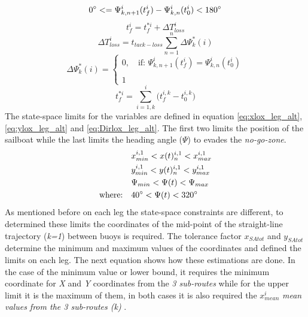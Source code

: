 \begin{equation}\label{eq:shift_Dir}
    0 \degree <=\Psi_{k,n+1}^{i}(t_{f}^{i}) - \Psi_{k,n}^{i}(t_{0}^{i}) <180 \degree
\end{equation}
\begin{equation} \label{eq:FinalTime}
    t_{f}^{i}=t_{f}^{*i} + \Delta T_{loss}^i
\end{equation}
\begin{equation} \label{eq:Tot_TimeLoss}
    \Delta T_{loss}^i=t_{tack-loss} \sum_{n=1}^{n} \Delta \Psi_{k}^* (i)
\end{equation}
\begin{equation} \label{eq:shiftDirCount}
\Delta\Psi_{k}^*(i)=
\begin{cases}
0, \quad  \text{if: } \Psi_{k,n+1}^{i}(t_{f}^{i}) = \Psi_{k,n}^{i}(t_{0}^{i})\\
\\
1 %
\end{cases}
\end{equation}
\begin{equation} \label{eq:TimeFinal_acum}
    t_{f}^{*i}=\sum_{i=1,k}^{i} \Big( t_{f}^{i,k} - t_{0}^{i,k} \Big)
\end{equation}
The state-space limits for the variables are defined in equation \ref{eq:xlox_leg_alt}, \ref{eq:ylox_leg_alt} and \ref{eq:Dirlox_leg_alt}.  The first two limits the position of the sailboat while the last limits the heading angle ($\Psi$) to evades the \textit{no-go-zone}.
\begin{align}
    \quad & x_{min}^{i,1}<x(t)_{n}^{i,1}<x_{max}^{i,1} \label{eq:xlox_leg_alt}\\
   \quad & y_{min}^{i,1}<y(t)_{n}^{i,1}<y_{max}^{i,1} \label{eq:ylox_leg_alt}\\
   \quad & \Psi_{min} <\Psi(t)< \Psi_{max} \label{eq:Dirlox_leg_alt} \\
  \text{where:} \quad & 40\degree  <\Psi(t)< 320\degree \nonumber 
\end{align}
 As mentioned before on each leg the state-space constraints are different, to determined these limits the coordinates of the mid-point of the straight-line trajectory (\textit{k=1}) between buoys is required. The tolerance factor $x_{SAtot}$ and $y_{SAtot}$ determine the minimum and maximum values of the coordinates and defined the limits on each leg. The next equation shows how these estimations are done. In the case of the minimum value or lower bound, it requires the minimum coordinate for \textit{X} and \textit{Y} coordinates from the \textit{3 sub-routes} while for the upper limit it is the maximum of them, in both cases it is also required the $x_{mean}^{i}$ \textit{mean values from the 3 sub-routes (k) }. \par 
 
